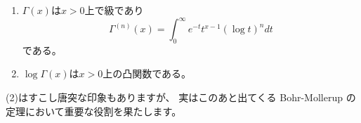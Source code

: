 \documentclass[report]{jlreq}
\begin{document}
\begin{proposition}
    \begin{enumerate}
        \item $\Gamma(x)$は$x > 0$上で{\smooth}級であり
            \begin{equation}
                \Gamma^{(n)}(x) = \int_0^\infty e^{-t} t^{x-1} (\log t)^n dt
                \label{11:eq:2}
            \end{equation}
            である。
        \item $\log \Gamma(x)$は$x > 0$上の凸関数である。
    \end{enumerate}
\end{proposition}

(2)はすこし唐突な印象もありますが、
実はこのあと出てくる Bohr-Mollerup の定理において重要な役割を果たします。
\end{document}
